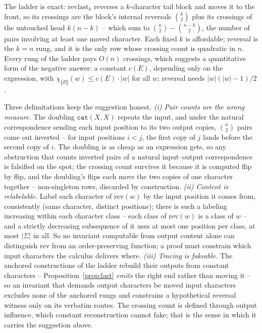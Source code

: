 \documentclass[runningheads,envcountsect]{llncs}
\renewenvironment{remark}
  {\rmfamily\trivlist\item[\hskip\labelsep{\itshape Remark.}]\ignorespaces}
  {\endtrivlist}
\begin{document}
\begin{remark}
    The ladder is exact: $\mathrm{revlast}_k$ reverses a $k$-character tail block and moves it to the front, so its crossings are the block's internal reversals $\binom{k}{2}$ plus its crossings of the untouched head $k(n-k)$ -- which sum to $\binom{n}{2} - \binom{n-k}{2}$, the number of pairs involving at least one moved character. Each fixed $k$ is affordable; reversal is the $k = n$ rung, and it is the only row whose crossing count is quadratic in $n$. Every rung of the ladder pays $O(n)$ crossings, which suggests a quantitative form of the negative answer: a constant $c(E)$, depending only on the expression, with $\chi_{\llbracket E \rrbracket}(w) \leq c(E)\cdot|w|$ for all $w$; reversal needs $|w|(|w|{-}1)/2$.

    Three delimitations keep the suggestion honest. \emph{(i) Pair counts are the wrong measure.} The doubling $\mathtt{cat}(X,X)$ repeats the input, and under the natural correspondence sending each input position to its two output copies, $\binom{n}{2}$ pairs come out inverted -- for input positions $i < j$, the first copy of $j$ lands before the second copy of $i$. The doubling is as cheap as an expression gets, so any obstruction that counts inverted pairs of a natural input--output correspondence is falsified on the spot; the crossing count survives it because it is computed flip by flip, and the doubling's flips each move the two copies of one character together -- non-singleton rows, discarded by construction. \emph{(ii) Content is relabelable.} Label each character of $\mathrm{rev}(w)$ by the input position it comes from, consistently (same character, distinct positions); there is such a labeling increasing within each character class -- each class of $\mathrm{rev}(w)$ is a class of $w$ -- and a strictly decreasing subsequence of it uses at most one position per class, at most $|\Sigma|$ in all. So no invariant computable from output content alone can distinguish $\mathrm{rev}$ from an order-preserving function; a proof must constrain which input characters the calculus delivers where. \emph{(iii) Tracing is fakeable.} The anchored constructions of the ladder rebuild their outputs from constant characters -- Proposition~\ref{prop:last} \emph{emits} the right end rather than moving it -- so an invariant that demands output characters be moved input characters excludes none of the anchored rungs and constrains a hypothetical reversal witness only on its verbatim routes. The crossing count is defined through output influence, which constant reconstruction cannot fake; that is the sense in which it carries the suggestion above.


\end{remark}
\end{document}
